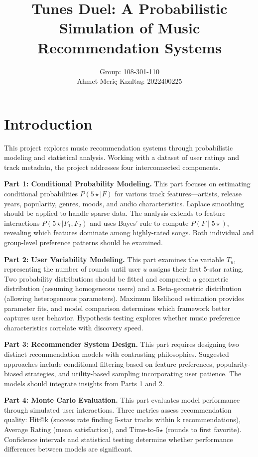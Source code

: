 \documentclass[12pt,a4paper]{article}
\title{\textbf{Tunes Duel: A Probabilistic Simulation of Music Recommendation Systems}}
\author{
Group: 108-301-110\\\n
Ahmet Meriç Kızıltaş: 2022400225\\\n
}
\date{}
\begin{document}
\maketitle

\section{Introduction}

This project explores music recommendation systems through probabilistic modeling and statistical analysis. Working with a dataset of user ratings and track metadata, the project addresses four interconnected components.

\textbf{Part 1: Conditional Probability Modeling.} This part focuses on estimating conditional probabilities $P(5\star \mid F)$ for various track features—artists, release years, popularity, genres, moods, and audio characteristics. Laplace smoothing should be applied to handle sparse data. The analysis extends to feature interactions $P(5\star \mid F_1, F_2)$ and uses Bayes' rule to compute $P(F \mid 5\star)$, revealing which features dominate among highly-rated songs. Both individual and group-level preference patterns should be examined.

\textbf{Part 2: User Variability Modeling.} This part examines the variable $T_u$, representing the number of rounds until user $u$ assigns their first 5-star rating. Two probability distributions should be fitted and compared: a geometric distribution (assuming homogeneous users) and a Beta-geometric distribution (allowing heterogeneous parameters). Maximum likelihood estimation provides parameter fits, and model comparison determines which framework better captures user behavior. Hypothesis testing explores whether music preference characteristics correlate with discovery speed.

\textbf{Part 3: Recommender System Design.} This part requires designing two distinct recommendation models with contrasting philosophies. Suggested approaches include conditional filtering based on feature preferences, popularity-biased strategies, and utility-based sampling incorporating user patience. The models should integrate insights from Parts 1 and 2.

\textbf{Part 4: Monte Carlo Evaluation.} This part evaluates model performance through simulated user interactions. Three metrics assess recommendation quality: Hit@k (success rate finding 5-star tracks within k recommendations), Average Rating (mean satisfaction), and Time-to-5$\star$ (rounds to first favorite). Confidence intervals and statistical testing determine whether performance differences between models are significant.
\end{document}
